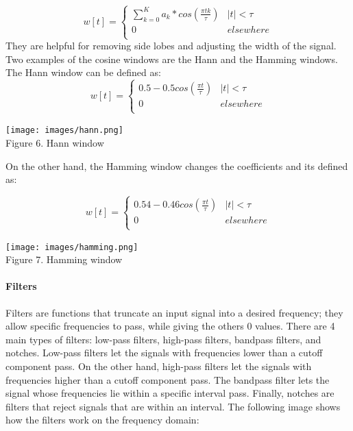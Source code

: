 \begin{itemize}
     \begin{equation*}
          w[t]=
        \begin{cases}
          \sum_{k=0}^{K} a_k*cos(\frac{\pi t k}{\tau})  &|t| < \tau \\
          0  &elsewhere \\
        \end{cases}
      \end{equation*}
    They are helpful for removing side lobes and adjusting the width of the signal. Two examples of the cosine windows are  the Hann and the Hamming windows. The Hann window can be defined as:
     \begin{equation*}
          w[t]=
        \begin{cases}
          0.5 - 0.5cos(\frac{\pi t}{\tau})  &|t| < \tau \\
          0  &elsewhere \\
        \end{cases}
      \end{equation*}


       \begin{center}
         \texttt{[image: images/hann.png]} \\
         Figure 6. Hann window
         \end{center}


    On the other hand, the Hamming window changes the coefficients and its defined as:

    \begin{equation*}
          w[t]=
        \begin{cases}
          0.54 - 0.46cos(\frac{\pi t}{\tau})  &|t| < \tau \\
          0  &elsewhere \\
        \end{cases}
      \end{equation*}

      \begin{center}
         \texttt{[image: images/hamming.png]} \\
         Figure 7. Hamming window
         \end{center}

\end{itemize}


\paragraph{Filters}

Filters are functions that truncate an input signal into a desired frequency; they allow specific frequencies to pass, while giving the others 0 values. There are 4 main types of filters: low-pass filters, high-pass filters, bandpass filters, and notches. Low-pass filters let the signals with frequencies lower than a cutoff component pass. On the other hand, high-pass filters let the signals with frequencies higher than a cutoff component pass. The bandpass filter lets the signal whose frequencies lie within a specific interval pass.  Finally, notches are filters that reject signals that are within an interval. The following image shows how the filters work on the frequency domain:

